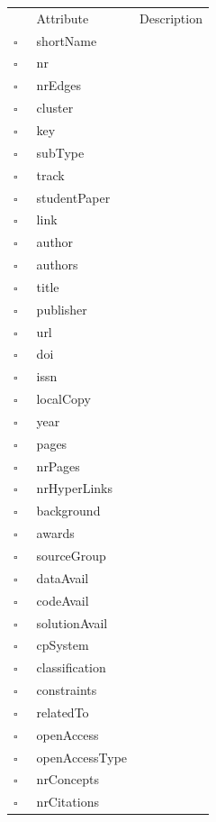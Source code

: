 \begin{table}
\caption{Work  }

\begin{longtable}{llp{8cm}}
& Attribute & Description \\
$\square$\ & shortName &  \\
$\square$\ & nr &  \\
$\square$\ & nrEdges &  \\
$\square$\ & cluster &  \\
$\square$\ & key &  \\
$\square$\ & subType &  \\
$\square$\ & track &  \\
$\square$\ & studentPaper &  \\
$\square$\ & link &  \\
$\square$\ & author &  \\
$\square$\ & authors &  \\
$\square$\ & title &  \\
$\square$\ & publisher &  \\
$\square$\ & url &  \\
$\square$\ & doi &  \\
$\square$\ & issn &  \\
$\square$\ & localCopy &  \\
$\square$\ & year &  \\
$\square$\ & pages &  \\
$\square$\ & nrPages &  \\
$\square$\ & nrHyperLinks &  \\
$\square$\ & background &  \\
$\square$\ & awards &  \\
$\square$\ & sourceGroup &  \\
$\square$\ & dataAvail &  \\
$\square$\ & codeAvail &  \\
$\square$\ & solutionAvail &  \\
$\square$\ & cpSystem &  \\
$\square$\ & classification &  \\
$\square$\ & constraints &  \\
$\square$\ & relatedTo &  \\
$\square$\ & openAccess &  \\
$\square$\ & openAccessType &  \\
$\square$\ & nrConcepts &  \\
$\square$\ & nrCitations &  \\

\end{longtable}
\end{table}
